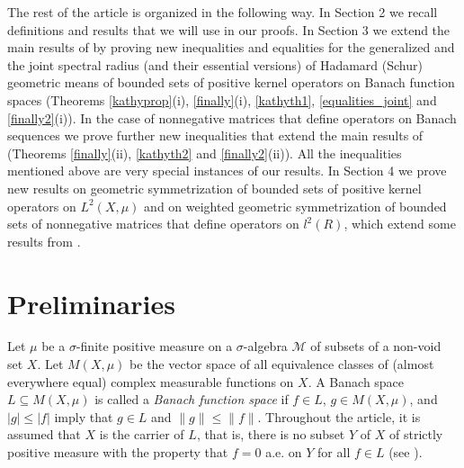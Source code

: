 \documentclass[12pt, reqno]{amsart}
\theoremstyle{definition}
\theoremstyle{remark}
\numberwithin{equation}{section}
\newcommand{\cM}{{\mathcal M}}
\begin{document}
The rest of the article is organized in the following way. In Section 2 we recall definitions and results that we will use in our proofs. %
In Section 3 we extend the main results of \cite{P19} by proving new inequalities and equalities for the generalized and the joint spectral radius (and their essential versions) of Hadamard (Schur) geometric means of bounded sets of positive kernel operators on  Banach function spaces (Theorems \ref{kathyprop}(i), \ref{finally}(i), \ref{kathyth1}, \ref{equalities_joint} and \ref{finally2}(i)). In the case of nonnegative matrices that define operators on  Banach sequences we prove further new inequalities that extend the main results of \cite{P12} (Theorems \ref{finally}(ii), \ref{kathyth2} and \ref{finally2}(ii)). All the inequalities mentioned above are very special instances of our results. In Section 4 we prove new results on geometric symmetrization of bounded sets of positive kernel operators  on $L^2 (X, \mu)$ and on weighted geometric symmetrization of bounded sets of nonnegative matrices that define operators on $l^2(R)$, which extend some results from \cite{Drn, P21, BP21}.



\section{Preliminaries}
\vspace{1mm}

Let $\mu$ be a $\sigma$-finite positive measure on a $\sigma$-algebra $\cM$ of subsets of a non-void set $X$.
Let $M(X,\mu)$ be the vector space of all equivalence classes of (almost everywhere equal)
complex measurable functions on $X$. A Banach space $L \subseteq M(X,\mu)$ is
called a {\it Banach function space} if $f \in L$, $g \in M(X,\mu)$,
and $|g| \le |f|$ imply that $g \in L$ and $\|g\| \le \|f\|$. Throughout the article, it is assumed that  $X$ is the carrier of $L$, that is, there is no subset $Y$ of $X$ of
 strictly positive measure with the property that $f = 0$ a.e. on $Y$ for all $f \in L$ (see \cite{Za83}).
\end{document}
